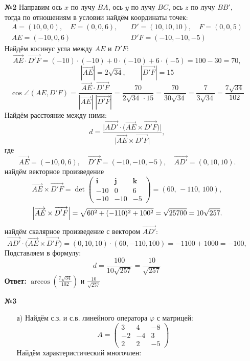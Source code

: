 \documentclass[a4paper]{article}
\renewcommand{\phi}{\varphi}
\begin{document}
\begin{enumerate}
    \item[\textbf{№2}]Направим ось $x$ по лучу $BA$, ось $y$ по лучу $BC$, ось $z$ по лучу $BB'$, тогда по отношениям в условии найдём координаты точек:
    $$\begin{aligned}
        A = (10, 0, 0), \quad E = (0, 0, 6), \quad & D' = (10, 10, 10), \quad F = (0, 0, 5)\\
        AE = (-10, 0, 6)\quad & D'F = (-10, -10, -5) 
    \end{aligned}$$
    Найдём косинус угла между $AE$ и $D'F$:
    $$
    \vec{AE}\cdot\vec{D'F}=(-10)\cdot(-10)+0\cdot(-10)+6\cdot(-5)=100-30=70,
    $$
    $$
    |\vec{AE}|=2\sqrt{34},\qquad
    |\vec{D'F}|=15
    $$
    $$
    \cos\angle(AE,D'F)
    =\frac{\vec{AE}\cdot\vec{D'F}}{|\vec{AE}|\;|\vec{D'F}|}
    =\frac{70}{2\sqrt{34}\,\cdot15}
    =\frac{70}{30\sqrt{34}}
    =\frac{7}{3\sqrt{34}}
    =\frac{7\sqrt{34}}{102}
    $$
    Найдём расстояние между ними:
    $$
    d=\frac{\bigl|\overrightarrow{A D'}\cdot\bigl(\overrightarrow{AE}\times\overrightarrow{D'F}\bigr)\bigr|}
    {\bigl|\overrightarrow{AE}\times\overrightarrow{D'F}\bigr|},
    $$
    где
    $$
    \overrightarrow{AE}=(-10,0,6),\quad
    \overrightarrow{D'F}=(-10,-10,-5),\quad
    \overrightarrow{A D'}=(0,10,10).
    $$
    найдём векторное произведение
    $$
    \overrightarrow{AE}\times\overrightarrow{D'F}
    =\det\begin{pmatrix}
    \mathbf{i}&\mathbf{j}&\mathbf{k}\\
    -10&0&6\\
    -10&-10&-5
    \end{pmatrix}
    =(60,\,-110,\,100),
    $$
    $$
    \Bigl|\overrightarrow{AE}\times\overrightarrow{D'F}\Bigr|
    =\sqrt{60^2+(-110)^2+100^2}
    =\sqrt{25700}
    =10\sqrt{257}.
    $$
    найдём скалярное произведение с вектором $\overrightarrow{A D'}$:
    $$
    \overrightarrow{A D'}\cdot\bigl(\overrightarrow{AE}\times\overrightarrow{D'F}\bigr)
    =(0,10,10)\cdot(60,-110,100)
    =-1100+1000=-100,
    $$ 
    Подставляем в формулу:
    $$
    d=\frac{100}{10\sqrt{257}}
    =\frac{10}{\sqrt{257}}
    $$
    \textbf{Ответ: } $\arccos(\frac{7\sqrt{34}}{102})$ и $\frac{10}{\sqrt{257}}$\\

    \item[\textbf{№3}]
    \begin{enumerate}
    \item[а)]
    Найдём с.з. и с.в. линейного оператора $\phi$ с матрицей:
    $$A=\begin{pmatrix}
        3 & 4 & -8\\
        -2 & -4 & 3\\
        2 & 2 & -5
    \end{pmatrix}$$
    Найдём характеристический многочлен:
    

\end{enumerate}
\end{enumerate}
\end{document}

